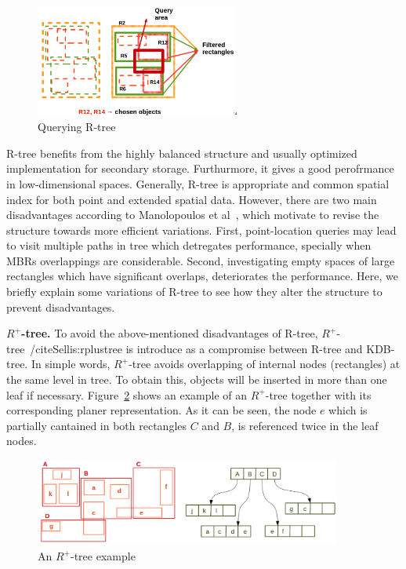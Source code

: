 \documentclass[a4paper,12pt]{article}
\begin{document}
\begin{figure}
\centering
\includegraphics[width=0.6\textwidth,height=0.2\textheight]{Rtree-query}
\caption{Querying R-tree}
\label{rtreequery}
\end{figure}

R-tree benefits from the highly balanced structure and usually optimized implementation for secondary storage. Furthurmore, it gives a good perofrmance in low-dimensional spaces. Generally, R-tree is appropriate and common spatial index for both point and extended spatial data. However, there are two main disadvantages according to Manolopoulos et al~\cite{Manolopoulos:2005}, which motivate to revise the structure towards more efficient variations. First, point-location queries may lead to visit multiple paths in tree which detregates performance, specially when MBRs overlappings are considerable. Second, investigating empty spaces of large rectangles which have significant overlaps, deteriorates the performance. Here, we briefly explain some variations of R-tree to see how they alter the structure to prevent disadvantages.


\textbf{$R^+$-tree.}
To avoid the above-mentioned disadvantages of R-tree, $R^+$-tree~/cite{Sellis:rplustree} is introduce as a compromise between R-tree and KDB-tree. In simple words, $R^+$-tree avoids overlapping of internal nodes (rectangles) at the same level in tree. To obtain this, objects will be inserted in more than one leaf if necessary. Figure~\ref{r+tree} shows an example of an $R^+$-tree together with its corresponding planer representation. As it can be seen, the node $e$ which is partially cantained in both rectangles $C$ and $B$, is referenced twice in the leaf nodes.


\begin{figure}
\centering
\includegraphics[width=0.9\textwidth]{r+tree}
\caption{An {$R^+$-tree} example}
\label{r+tree}
\end{figure}
\end{document}
